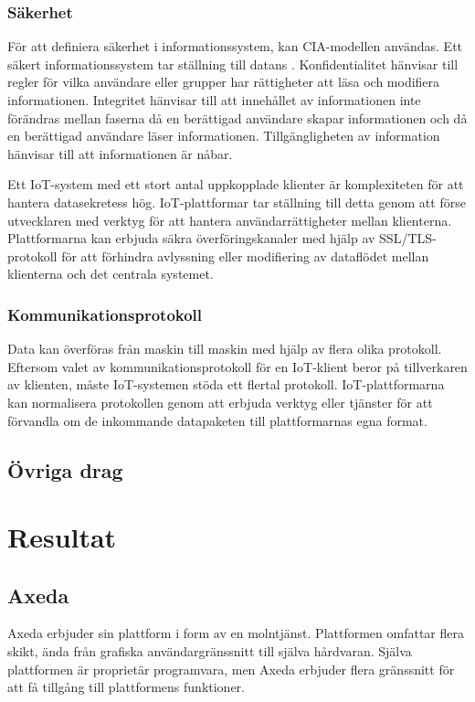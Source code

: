 \subsubsection{Säkerhet}
För att definiera säkerhet i informationssystem, kan CIA-modellen användas.
Ett säkert informationssystem tar ställning till datans 
. Konfidentialitet
hänvisar till regler för vilka användare eller grupper har rättigheter
att läsa och modifiera informationen. Integritet hänvisar till att innehållet
av informationen inte förändras mellan faserna då en berättigad användare skapar
informationen och då en berättigad användare läser informationen.
Tillgängligheten av information hänvisar till att informationen är nåbar.

Ett IoT-system med ett stort antal uppkopplade klienter är komplexiteten
för att hantera datasekretess hög. IoT-plattformar tar ställning till detta
genom att förse utvecklaren med verktyg för att hantera användarrättigheter
mellan klienterna. Plattformarna kan erbjuda säkra överföringskanaler
med hjälp av SSL/TLS-protokoll  för att 
förhindra avlyssning eller modifiering av dataflödet mellan klienterna och det
centrala systemet.

\subsubsection{Kommunikationsprotokoll}
Data kan överföras från maskin till maskin med hjälp av flera olika protokoll.
Eftersom valet av kommunikationsprotokoll för en IoT-klient beror på
tillverkaren av klienten, måste IoT-systemen stöda ett flertal protokoll.
IoT-plattformarna kan normalisera protokollen genom att erbjuda verktyg eller
tjänster för att förvandla om de inkommande datapaketen till plattformarnas
egna format.

\subsection{Övriga drag}



\pagebreak
\section{Resultat}
\label{sec:esimluku}

\subsection{Axeda}
Axeda erbjuder sin plattform i form av en molntjänst. Plattformen omfattar
flera skikt, ända från grafiska användargränssnitt till själva hårdvaran.
Själva plattformen är proprietär programvara, men Axeda erbjuder flera 
gränssnitt för att få tillgång till plattformens funktioner. \cite{axeda}

